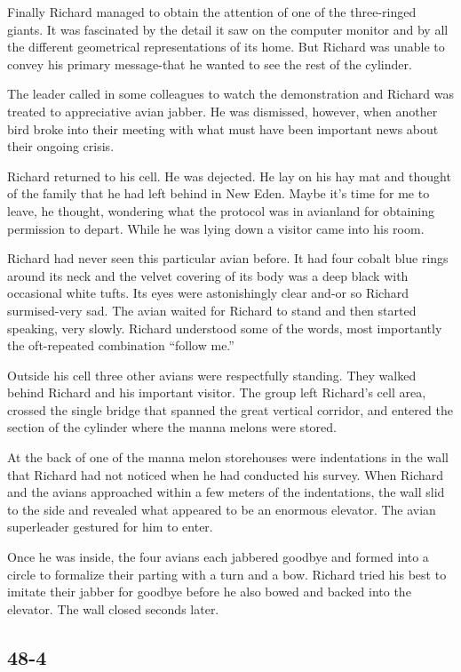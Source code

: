 \documentclass[]{article}
\begin{document}
{Finally Richard managed to obtain the attention of one of the three-ringed giants.  It was fascinated by the detail it saw on the computer monitor and by all the different geometrical representations of its home.  But Richard was unable to convey his primary message-that he wanted to see the rest of the cylinder.

The leader called in some colleagues to watch the demonstration and Richard was treated to appreciative avian jabber.  He was dismissed, however, when another bird broke into their meeting with what must have been important news about their ongoing crisis.

Richard returned to his cell.  He was dejected.  He lay on his hay mat and thought of the family that he had left behind in New Eden.  Maybe it’s time for me to leave, he thought, wondering what the protocol was in avianland for obtaining permission to depart.  While he was lying down a visitor came into his room.

Richard had never seen this particular avian before.  It had four cobalt blue rings around its neck and the velvet covering of its body was a deep black with occasional white tufts.  Its eyes were astonishingly clear and-or so Richard surmised-very sad.  The avian waited for Richard to stand and then started speaking, very slowly.  Richard understood some of the words, most importantly the oft-repeated combination “follow me.”

Outside his cell three other avians were respectfully standing.  They walked behind Richard and his important visitor.  The group left Richard’s cell area, crossed the single bridge that spanned the great vertical corridor, and entered the section of the cylinder where the manna melons were stored.

At the back of one of the manna melon storehouses were indentations in the wall that Richard had not noticed when he had conducted his survey.  When Richard and the avians approached within a few meters of the indentations, the wall slid to the side and revealed what appeared to be an enormous elevator.  The avian superleader gestured for him to enter.

Once he was inside, the four avians each jabbered goodbye and formed into a circle to formalize their parting with a turn and a bow.  Richard tried his best to imitate their jabber for goodbye before he also bowed and backed into the elevator.  The wall closed seconds later.

	
\subsection*{48-4}

}
\end{document}
